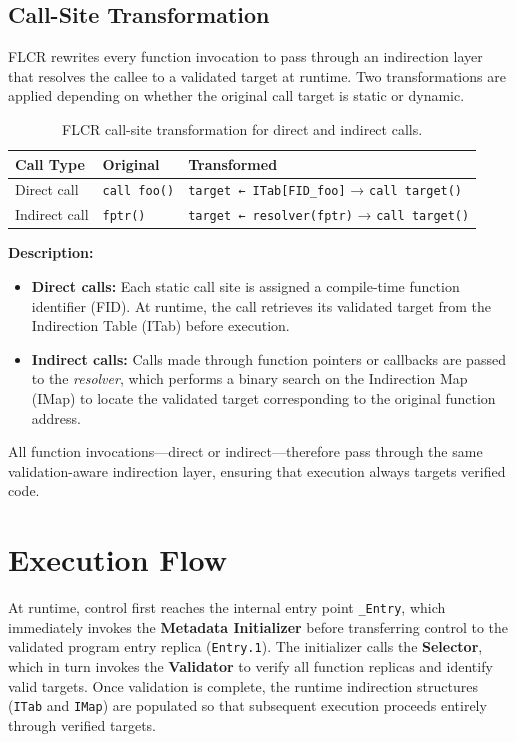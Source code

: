 \subsection{Call-Site Transformation}
FLCR rewrites every function invocation to pass through an indirection layer that resolves
the callee to a validated target at runtime.
Two transformations are applied depending on whether the original call target is static or dynamic.

\begin{table}[h!]
  \centering
  \renewcommand{\arraystretch}{1.2}
  \begin{tabularx}{\linewidth}{|l|X|X|}
    \hline
    \textbf{Call Type} & \textbf{Original} & \textbf{Transformed} \\ \hline
    Direct call   & \texttt{call foo()} & \texttt{target ← ITab[FID\_foo]} → \texttt{call target()} \\ \hline
    Indirect call & \texttt{fptr()}     & \texttt{target ← resolver(fptr)} → \texttt{call target()} \\ \hline
  \end{tabularx}
  \caption{FLCR call-site transformation for direct and indirect calls.}
  \label{tab:flcr-callsite}
\end{table}

\textbf{Description:}
\begin{itemize}
  \item \textbf{Direct calls:}
        Each static call site is assigned a compile-time function identifier (FID).
        At runtime, the call retrieves its validated target from the Indirection Table (ITab)
        before execution.
  \item \textbf{Indirect calls:}
        Calls made through function pointers or callbacks are passed to the \textit{resolver},
        which performs a binary search on the Indirection Map (IMap) to locate the validated
        target corresponding to the original function address.
\end{itemize}

All function invocations—direct or indirect—therefore pass through the same validation-aware
indirection layer, ensuring that execution always targets verified code.

\section{Execution Flow}
At runtime, control first reaches the internal entry point \texttt{\_Entry}, which immediately
invokes the \textbf{Metadata Initializer} before transferring control to the validated
program entry replica (\texttt{Entry.1}).
The initializer calls the \textbf{Selector}, which in turn invokes the \textbf{Validator}
to verify all function replicas and identify valid targets.
Once validation is complete, the runtime indirection structures (\texttt{ITab} and
\texttt{IMap}) are populated so that subsequent execution proceeds entirely through
verified targets.

